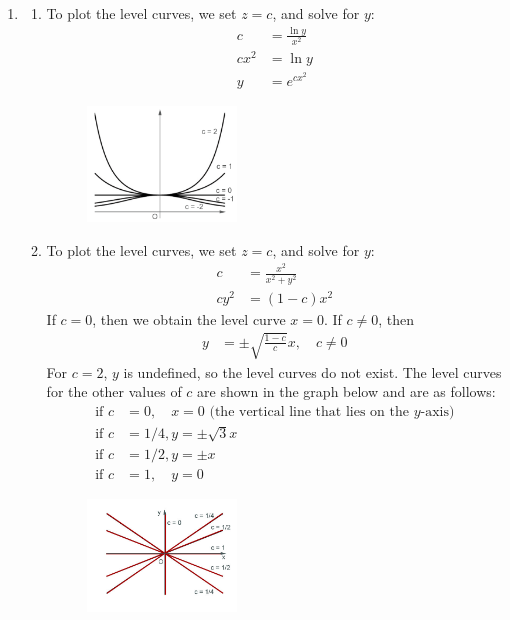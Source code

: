 \begin{enumerate}
\item
\begin{enumerate}
\item To plot the level curves, we set $z = c$, and solve for $y$: 
\begin{align*} 
  c &= \frac{\ln y}{x^2} \\
  cx^2&= \ln y \\
  y &= e^{cx^2}
\end{align*}
\begin{figure}[!htbp]
  \begin{center}
    \includegraphics[width=0.4\textwidth]{ImgLevelCurvesA.pdf}
  \end{center}
\end{figure}
\item To plot the level curves, we set $z = c$, and solve for $y$: 
\begin{align*} 
  c &= \frac{x^2}{x^2+y^2} \\
  cy^2 &= (1-c)x^2
\end{align*}
If $c=0$, then we obtain the level curve $x = 0$. If $c \ne0$, then
\begin{align*} 
  y &= \pm \sqrt{\frac{1-c}{c}}x, \quad c \ne0
\end{align*}
For $c=2$, $y$ is undefined, so the level curves do not exist. The level curves for the other values of $c$ are shown in the graph below and are as follows:
\begin{align*} 
  \text{if } c&=0, \quad x = 0 \text{ (the vertical line that lies on the } y \text{-axis})\\
  \text{if } c&=1/4, y = \pm \sqrt{3}x\\
  \text{if } c&=1/2, y = \pm x\\  
  \text{if } c&=1, \quad y = 0    
\end{align*}

\begin{figure}[!htbp]
  \begin{center}
    \includegraphics[width=0.4\textwidth]{ImgLevelCurvesB.jpg}
  \end{center}
\end{figure}


\end{enumerate}
\end{enumerate}
